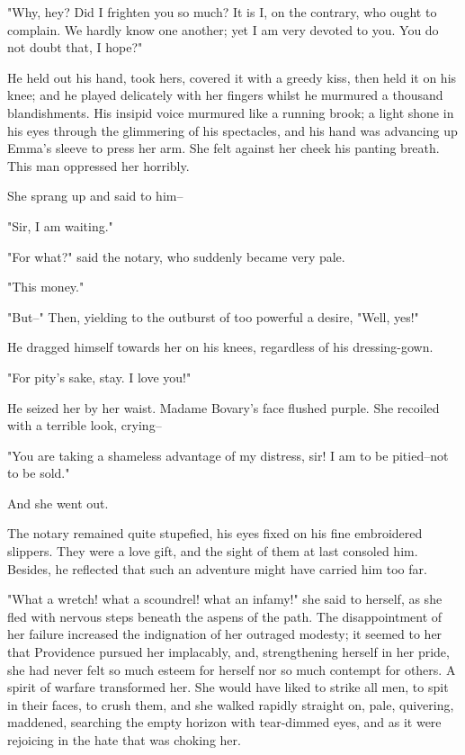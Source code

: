 \documentclass[11pt,twocolumn]{ltugboat}
\begin{document}
"Why, hey? Did I frighten you so much? It is I, on the contrary, who
ought to complain. We hardly know one another; yet I am very devoted to
you. You do not doubt that, I hope?"

He held out his hand, took hers, covered it with a greedy kiss, then
held it on his knee; and he played delicately with her fingers whilst
he murmured a thousand blandishments. His insipid voice murmured like a
running brook; a light shone in his eyes through the glimmering of his
spectacles, and his hand was advancing up Emma's sleeve to press her
arm. She felt against her cheek his panting breath. This man oppressed
her horribly.

She sprang up and said to him--

"Sir, I am waiting."

"For what?" said the notary, who suddenly became very pale.

"This money."

"But--" Then, yielding to the outburst of too powerful a desire, "Well,
yes!"

He dragged himself towards her on his knees, regardless of his
dressing-gown.

"For pity's sake, stay. I love you!"

He seized her by her waist. Madame Bovary's face flushed purple. She
recoiled with a terrible look, crying--

"You are taking a shameless advantage of my distress, sir! I am to be
pitied--not to be sold."

And she went out.

The notary remained quite stupefied, his eyes fixed on his fine
embroidered slippers. They were a love gift, and the sight of them at
last consoled him. Besides, he reflected that such an adventure might
have carried him too far.

"What a wretch! what a scoundrel! what an infamy!" she said to herself,
as she fled with nervous steps beneath the aspens of the path. The
disappointment of her failure increased the indignation of her outraged
modesty; it seemed to her that Providence pursued her implacably, and,
strengthening herself in her pride, she had never felt so much esteem
for herself nor so much contempt for others. A spirit of warfare
transformed her. She would have liked to strike all men, to spit in
their faces, to crush them, and she walked rapidly straight on, pale,
quivering, maddened, searching the empty horizon with tear-dimmed eyes,
and as it were rejoicing in the hate that was choking her.
\end{document}
